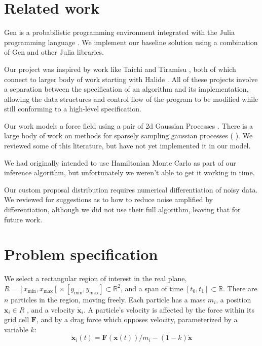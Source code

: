 \documentclass[11pt]{article}
\newcommand{\xv}[0]{\mathbf{x}}
\newcommand{\Fv}[0]{\mathbf{F}}
\begin{document}
\section{Related work}
\label{sec:org7fdda86}
Gen \citep{GenPaper} is a probabilistic programming environment integrated with the Julia programming language \citep{Julia}. We implement our baseline solution using a combination of Gen and other Julia libraries.

Our project was inspired by work like Taichi \citep{Taichi} and Tiramisu \citep{Tiramisu}, both of which connect to larger body of work starting with Halide \citep{Halide}. All of these projects involve a separation between the specification of an algorithm and its implementation, allowing the data structures and control flow of the program to be modified while still conforming to a high-level specification.

Our work models a force field using a pair of 2d Gaussian Processes \citep{GPs}. There is a large body of work on methods for sparsely sampling gaussian processes (\cite{UnderstandingSparseGP} \cite{SparseSpectrumGP} \cite{UnifyingGP}). We reviewed some of this literature, but have not yet implemented it in our model.

We had originally intended to use Hamiltonian Monte Carlo \citep{HMC} as part of our inference algorithm, but unfortunately we weren't able to get it working in time.

Our custom proposal distribution requires numerical differentiation of noisy data. We reviewed \cite{NumDiffNonsmooth} for suggestions as to how to reduce noise amplified by differentiation, although we did not use their full algorithm, leaving that for future work.

\section{Problem specification}
\label{sec:org25cf2d1}
We select a rectangular region of interest in the real plane, \(R = [x_{\min}, x_{\max}] \times [y_{\min}, y_{\max}] \subset \mathbb{R}^2\), and a span of time \([t_0, t_1] \subset \mathbb{R}\). There are \(n\) particles in the region, moving freely. Each particle has a mass \(m_i\), a position \(\xv_i \in R\) , and a velocity \(\dot{\xv}_i\). A particle's velocity is affected by the force within its grid cell \(\Fv\), and by a drag force which opposes velocity, parameterized by a variable \(k\):
$$\ddot{\xv}_i(t) = \Fv(\xv(t))/m_i - (1-k)\dot{\xv}$$
\end{document}

